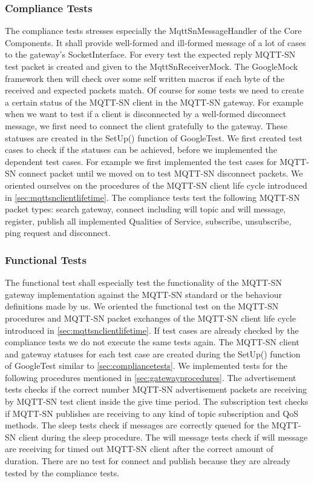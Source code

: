 \subsubsection{Compliance Tests}\label{sec:compliancetests}
The compliance tests stresses especially the MqttSnMessageHandler of the Core Components.
It shall provide well-formed and ill-formed message of a lot of cases to the gateway's SocketInterface.
For every test the expected reply MQTT-SN test packet is created and given to the MqttSnReceiverMock. The GoogleMock framework then will check over some self written macros if each byte of the received and expected packets match.
Of course for some tests we need to create a certain status of the MQTT-SN client in the MQTT-SN gateway.
For example when we want to test if a client is disconnected by a well-formed disconnect message, we first need to connect the client gratefully to the gateway.
These statuses are created in the SetUp() function of GoogleTest.
We first created test cases to check if the statuses can be achieved, before we implemented the dependent test cases.
For example we first implemented the test cases for MQTT-SN connect packet until we moved on to test MQTT-SN disconnect packets.
We oriented ourselves on the procedures of the MQTT-SN client life cycle introduced in \autoref{sec:mqttsnclientlifetime}.
The compliance tests test the following MQTT-SN packet types: search gateway, connect including will topic and will message, register, publish all implemented Qualities of Service, subscribe, unsubscribe, ping request and disconnect.

\subsubsection{Functional Tests}
The functional test shall especially test the functionality of the MQTT-SN gateway implementation against the MQTT-SN standard or the behaviour definitions made by us.
We oriented the functional test on the MQTT-SN procedures and MQTT-SN packet exchanges of the MQTT-SN client life cycle introduced in \autoref{sec:mqttsnclientlifetime}.
If test cases are already checked by the compliance tests we do not execute the same tests again.
The MQTT-SN client and gateway statuses for each test case are created during the SetUp() function of GoogleTest similar to \autoref{sec:compliancetests}.
We implemented tests for the following procedures mentioned in \autoref{sec:gatewayprocedures}.
The advertisement tests checks if the correct number MQTT-SN advertisement packets are receiving by MQTT-SN test client inside the give time period.
The subscription test checks if MQTT-SN publishes are receiving to any kind of topic subscription and QoS methods.
The sleep tests check if messages are correctly queued for the MQTT-SN client during the sleep procedure.
The will message tests check if will message are receiving for timed out MQTT-SN client after the correct amount of duration.
There are no test for connect and publish because they are already tested by the compliance tests.

